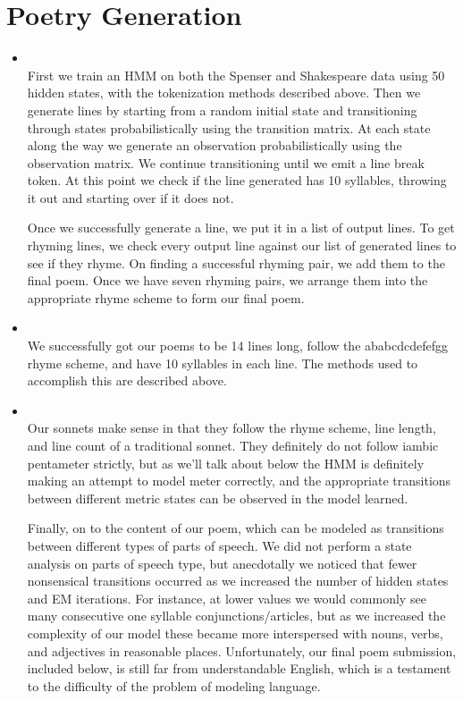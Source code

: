 \section{Poetry Generation}
\medskip
\begin{itemize}



    \item {} \\
    First we train an HMM on both the Spenser and Shakespeare data using 50
    hidden states, with the tokenization methods described above. Then we generate
    lines by starting from a random initial state and transitioning through states
    probabilistically using the transition matrix. At each state along the way we
    generate an observation probabilistically using the observation matrix. We
    continue transitioning until we emit a line break token. At this point
    we check if the line generated has 10 syllables, throwing it out and starting
    over if it does not.

    Once we successfully generate a line, we put it in a list of output lines.
    To get rhyming lines, we check every output line against our list of generated
    lines to see if they rhyme. On finding a successful rhyming pair, we add them
    to the final poem. Once we have seven rhyming pairs, we arrange them into the
    appropriate rhyme scheme to form our final poem.

    \item {} \\
    We successfully got our poems to be 14 lines long, follow the ababcdcdefefgg
    rhyme scheme, and have 10 syllables in each line. The methods used to accomplish
    this are described above.

    \item {} \\
    Our sonnets make sense in that they follow the rhyme scheme, line length,
    and line count of a traditional sonnet. They definitely do not follow
    iambic pentameter strictly, but as we'll talk about below the HMM is definitely
    making an attempt to model meter correctly, and the appropriate transitions
    between different metric states can be observed in the model learned.

    Finally, on to the content of our poem, which can be modeled as transitions
    between different types of parts of speech. We did not perform a state analysis
    on parts of speech type, but anecdotally we noticed that fewer nonsensical
    transitions occurred as we increased the number of hidden states and EM
    iterations. For instance, at lower values we would commonly see many
    consecutive one syllable conjunctions/articles, but as we increased the complexity of
    our model these became more interspersed with nouns, verbs, and adjectives
    in reasonable places. Unfortunately, our final poem submission, included
    below, is still far from understandable English, which is a testament to
    the difficulty of the problem of modeling language. 


\end{itemize}
